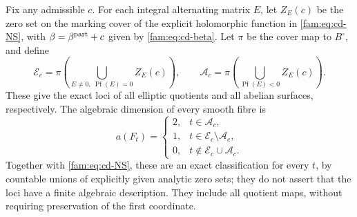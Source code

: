 \begin{theorem}\hypertarget{tag-01QW}{}\label{fam:src:D.1.6}\label{fam:st:D.1.6}

Fix any admissible $c$. For each integral alternating matrix $E$, let
$Z_E(c)$ be the zero set on the marking cover of the explicit holomorphic
function in \eqref{fam:eq:cd-NS}, with $\beta=\beta^{\rm part}+c$ given by
\eqref{fam:eq:cd-beta}. Let $\pi$ be the cover map to $B^\circ$, and define
\[
 \mathcal E_c=\pi\!\left(\bigcup_{E\ne0,\ \operatorname{Pf}(E)=0}Z_E(c)\right),
 \qquad
 \mathcal A_c=\pi\!\left(\bigcup_{\operatorname{Pf}(E)<0}Z_E(c)\right).
\]
These give the exact loci of all elliptic quotients and all abelian
surfaces, respectively. The algebraic dimension of every smooth fibre is
\[
 a(F_t)=
 \begin{cases}
 2,&t\in\mathcal A_c,\\
 1,&t\in\mathcal E_c\setminus\mathcal A_c,\\
 0,&t\notin\mathcal E_c\cup\mathcal A_c.
 \end{cases}
\]
Together with \eqref{fam:eq:cd-NS}, these are an exact classification for every
$t$, by countable unions of explicitly given analytic zero sets; they do
not assert that the loci have a finite algebraic description. They include
all quotient maps, without requiring preservation of the first coordinate.
\end{theorem}

